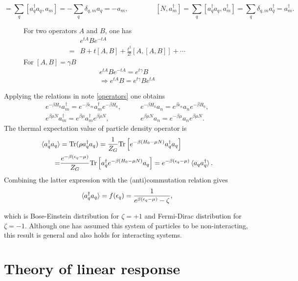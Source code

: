 \documentclass[a4paper,12pts,dvipsnames]{article}
\numberwithin{equation}{section}
\newcounter{mynote}
\newcommand\StoryNote[3][]{%
	\begin{figure}
		\begin{mynote}[label=#3]
			#2
		\end{mynote}%
	\end{figure}%
}
\begin{document}
\begin{equation}
[N,a_m] = \sum_{q}[a^{\dagger}_qa_q,a_m] = -\sum_{q}\delta_{q,m}a_q = -a_m,\qquad\qquad [N,a^{\dagger}_m] = \sum_{q}[a^{\dagger}_qa_q,a^{\dagger}_m] = \sum_{q}\delta_{q,m}a^{\dagger}_q = a^{\dagger}_m.
\end{equation}
\begin{story}
	\StoryNote{For two operators $A$ and $B$, one has\begin{align}
			&e^{tA}Be^{-tA}\nonumber\\ 
			=& B + t[A,B] + \frac{t^2}{2!}[A,[A,B]] + \cdots\nonumber
		\end{align}
		For $[A,B] = \gamma B$
		\begin{align}
			e^{tA}Be^{-tA} = e^{t\gamma}B\nonumber\\
			\Rightarrow e^{tA}B = e^{t\gamma}Be^{tA}\nonumber
	\end{align}}{operators}
	Applying the relations in note \ref{operators} one obtains
	\begin{align}
		e^{-\beta H_0}a^{\dagger}_m = e^{-\beta\epsilon_m}a^{\dagger}_me^{-\beta H_0},&\qquad e^{-\beta H_0}a_n = e^{\beta\epsilon_n}a_ne^{-\beta H_0},\\
		e^{\beta\mu N}a^{\dagger}_m = e^{\beta\mu}a^{\dagger}_me^{\beta\mu N},&\qquad e^{\beta\mu N}a_n = e^{-\beta\mu}a_ne^{\beta\mu N}.
	\end{align}
	The thermal expectation value of particle density operator is
	\begin{align}
		\braket{a^{\dagger}_qa_q} &= \text{Tr}(\rho a^{\dagger}_qa_q) = \frac{1}{Z_G}\text{Tr}\left[e^{-\beta(H_0-\mu N)}a^{\dagger}_qa_q\right]\nonumber\\
		=& \frac{e^{-\beta(\epsilon_q-\mu)}}{Z_G}\text{Tr}\left[a^{\dagger}_qe^{-\beta(H_0-\mu N)}a_q\right] = e^{-\beta(\epsilon_q-\mu)}\braket{a_qa^{\dagger}_q}.
	\end{align}
	Combining the latter expression with the (anti)commutation relation gives
	\begin{equation}
		\braket{a^{\dagger}_qa_q} = f(\epsilon_q) = \frac{1}{e^{\beta(\epsilon_q-\mu)}-\zeta},
	\end{equation}
\end{story}
which is Bose-Einstein distribution for $\zeta=+1$ and Fermi-Dirac distribution for $\zeta=-1$. Although one has assumed this system of particles to be non-interacting, this result is general and also holds for interacting systems.
\section{Theory of linear response}
\end{document}
